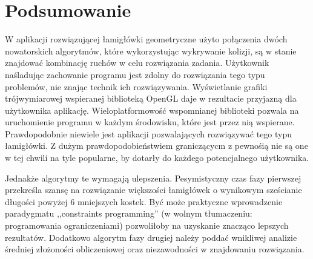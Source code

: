 \chapter{Podsumowanie}
\thispagestyle{chapterBeginStyle}

W aplikacji rozwiązującej łamigłówki geometryczne użyto połączenia dwóch nowatorskich algorytmów, które wykorzystując wykrywanie kolizji, są w stanie znajdować kombinację ruchów w celu rozwiązania zadania. Użytkownik naśladując zachowanie programu jest zdolny do rozwiązania tego typu problemów, nie znając technik ich rozwiązywania. Wyświetlanie grafiki trójwymiarowej wspieranej biblioteką OpenGL daje w rezultacie przyjazną dla użytkownika aplikację. Wieloplatformowość wspomnianej biblioteki pozwala na uruchomienie programu w każdym środowisku, które jest przez nią wspierane. Prawdopodobnie niewiele jest aplikacji pozwalających rozwiązywać tego typu łamigłówki. Z dużym prawdopodobieństwiem graniczącycm z pewnośią nie są one w tej chwili na tyle popularne, by dotarły do każdego potencjalnego użytkownika.

Jednakże algorytmy te wymagają ulepszenia. Pesymistyczny czas fazy pierwszej przekreśla szansę na rozwiązanie większości łamigłówek o wynikowym sześcianie długości powyżej 6 mniejszych kostek. Być może praktyczne wprowadzenie paradygmatu ,,constraints programming'' (w wolnym tłumaczeniu: programowania ograniczeniami) pozwoliłoby na uzyskanie znacząco lepszych rezultatów. Dodatkowo algorytm fazy drugiej należy poddać wnikliwej analizie średniej złożoności obliczeniowej oraz niezawodności w znajdowaniu rozwiązania.
